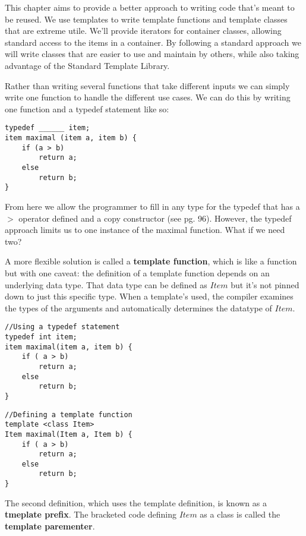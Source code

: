 
This chapter aims to provide a better approach to writing code that's meant to be reused. We use templates to write template functions and template classes that are extreme utile. We'll provide iterators for container classes, allowing standard access to the items in a container. By following a standard approach we will write classes that are easier to use and maintain by others, while also taking advantage of the Standard Template Library.

Rather than writing several functions that take different inputs we can simply write one function to handle the different use cases. We can do this by writing one function and a typedef statement like so:
\begin{lstlisting}[basicstyle=\ttfamily]
typedef ______ item;
item maximal (item a, item b) {
    if (a > b)
        return a;
    else
        return b;
}
\end{lstlisting}

From here we allow the programmer to fill in any type for the typedef that has a $>$ operator defined and a copy constructor (see pg. 96). However, the typedef approach limits us to one instance of the maximal function. What if we need two?

A more flexible solution is called a \textbf{template function}, which is like a function but with one caveat: the definition of a template function depends on an underlying data type. That data type can be defined as $Item$ but it's not pinned down to just this specific type. When a template's used, the compiler examines the types of the arguments and automatically determines the datatype of $Item$.

\begin{lstlisting}[basicstyle=\ttfamily]
//Using a typedef statement
typedef int item;
item maximal(item a, item b) {
    if ( a > b)
        return a;
    else 
        return b;
}
\end{lstlisting}

\begin{lstlisting}[basicstyle=\ttfamily]
//Defining a template function
template <class Item>
Item maximal(Item a, Item b) {
    if ( a > b)
        return a;
    else 
        return b;
}
\end{lstlisting}

The second definition, which uses the template definition, is known as a \textbf{tmeplate prefix}. The bracketed code defining $Item$ as a class is called the \textbf{template parementer}.

